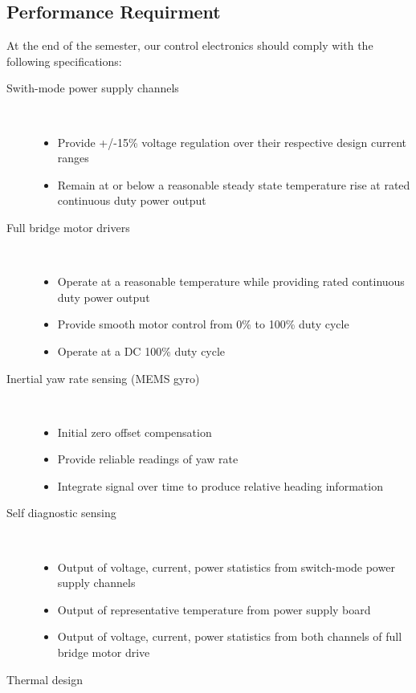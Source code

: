 \documentclass[12pt]{article}
\begin{document}
\begin{itemize}
 \subsection{Performance Requirment}
 At the end of the semester, our control electronics should comply with the following specifications:
 \begin{description}
    \item[Swith-mode power supply channels] 
    \\

    \begin{itemize}
       \item Provide +/-15\% voltage regulation over their respective design current ranges
       \item Remain at or below a reasonable steady state temperature rise at rated continuous duty power output
       \end{itemize}
    \item[Full bridge motor drivers] 
    \\
    
    \begin{itemize}
       \item Operate at a reasonable temperature while providing rated continuous duty power output
      \item  Provide smooth motor control from 0\% to 100\% duty cycle
      \item Operate at a DC 100\% duty cycle
      \end{itemize}
    \item[Inertial yaw rate sensing (MEMS gyro)] 
    \\
    
    \begin{itemize}
      \item Initial zero offset compensation 
      \item Provide reliable readings of yaw rate
      \item Integrate signal over time to produce relative heading information
      \end{itemize}
    \item[Self diagnostic sensing] 
    \\
    
    
    \begin{itemize}
      \item Output of voltage, current, power statistics from switch-mode power supply channels
      \item Output of representative temperature from power supply board
      \item Output of voltage, current, power statistics from both channels of full bridge motor drive
      \end{itemize}
    \item[Thermal design] \\
    

\end{description}
\end{itemize}
\end{document}
